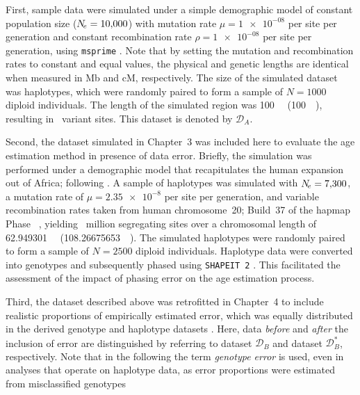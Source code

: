 First, sample data were simulated under a simple demographic model of constant population size (${N_{\!e} = \num{10000}}$) with mutation rate ${\mu = \num{1e-08}}$ per site per generation and constant recombination rate ${\rho = \num{1e-08}}$ per site per generation, using \texttt{msprime} \citep{Kelleher:2016fn}.
Note that by setting the mutation and recombination rates to constant and equal values, the physical and genetic lengths are identical when measured in \gls{Mb} and \gls{cM}, respectively.
The size of the simulated dataset was  haplotypes, which were randomly paired to form a sample of ${N=\num{1000}}$ diploid individuals.
The length of the simulated region was \SI{100}{\mega\basepair} (\SI{100}{\centi\morgan}), resulting in ~variant sites.
This dataset is denoted by $\mathcal{D}_A$.

Second, the dataset simulated in Chapter~3 was included here to evaluate the age estimation method in presence of data error.
Briefly, the simulation was performed under a demographic model that recapitulates the human expansion out of Africa; following \citet{Gutenkunst:2009gs}.
A sample of  haplotypes was simulated with ${N_{\!e} = \num{7300}}$, a mutation rate of ${\mu = \num[round-precision=2]{2.35e-8}}$ per site per generation, and variable recombination rates taken from human chromosome~20; Build~37 of the \gls{hapmap} Phase~ \citep{Frazer:2007kha, InternationalHapMapConsortium:2010en}, yielding ~million segregating sites over a chromosomal length of \SI{62.949301}{\mega\basepair} (\SI{108.26675653}{\centi\morgan}).
The simulated haplotypes were randomly paired to form a sample of ${N = \num{2500}}$ diploid individuals.
Haplotype data were converted into genotypes and subsequently phased using \texttt{SHAPEIT\,2} \citep{Delaneau:2008dk,Delaneau:2013hi}.
This facilitated the assessment of the impact of phasing error on the age estimation process.

Third, the dataset described above was retrofitted in Chapter~4 to include realistic proportions of empirically estimated error, which was equally distributed in the derived genotype and haplotype datasets .
Here, data \emph{before} and \emph{after} the inclusion of error are distinguished by referring to dataset $\mathcal{D}_B$ and dataset $\mathcal{D}_B^{\ast}$, respectively.
Note that in the following the term \emph{genotype error} is used, even in analyses that operate on haplotype data, as error proportions were estimated from misclassified genotypes 


